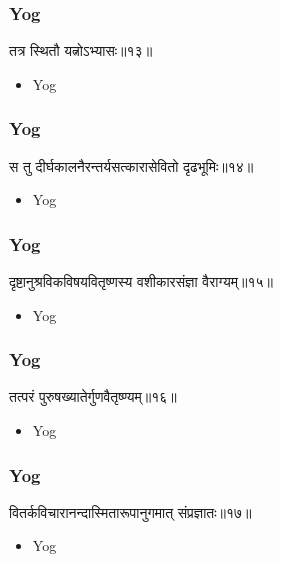 \begin{frame}[fragile]\frametitle{Yog}
\begin{sanskrit}
तत्र स्थितौ यत्नोऽभ्यासः॥१३॥
\end{sanskrit}
	\begin{itemize}
	\item Yog 
	\end{itemize}
\end{frame}

\begin{frame}[fragile]\frametitle{Yog}
\begin{sanskrit}
स तु दीर्घकालनैरन्तर्यसत्कारासेवितो दृढभूमिः॥१४॥
\end{sanskrit}
	\begin{itemize}
	\item Yog 
	\end{itemize}
\end{frame}

\begin{frame}[fragile]\frametitle{Yog}
\begin{sanskrit}
दृष्टानुश्रविकविषयवितृष्णस्य वशीकारसंज्ञा वैराग्यम्॥१५॥
\end{sanskrit}
	\begin{itemize}
	\item Yog 
	\end{itemize}
\end{frame}


\begin{frame}[fragile]\frametitle{Yog}
\begin{sanskrit}
तत्परं पुरुषख्यातेर्गुणवैतृष्ण्यम्॥१६॥
\end{sanskrit}
	\begin{itemize}
	\item Yog 
	\end{itemize}
\end{frame}



\begin{frame}[fragile]\frametitle{Yog}
\begin{sanskrit}
वितर्कविचारानन्दास्मितारूपानुगमात् संप्रज्ञातः॥१७॥
\end{sanskrit}
	\begin{itemize}
	\item Yog 
	\end{itemize}
\end{frame}

